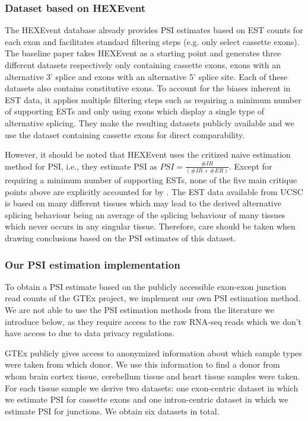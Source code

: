 \subsubsection{Dataset based on HEXEvent}
The HEXEvent database already provides PSI estimates based on EST counts for each exon and facilitates standard filtering steps (e.g. only select cassette exons). 
The baseline paper \cite{dsc} takes HEXEvent as a starting point and generates three different datasets respectively only containing cassette exons, exons with an alternative 3' splice and exons with an alternative 5' splice site. Each of these datasets also contains constitutive exons. To account for the biases inherent in EST data, it applies multiple filtering steps such as requiring a minimum number of supporting ESTs and only using exons which display a single type of alternative splicing. They make the resulting datasets publicly available and we use the dataset containing cassette exons for direct comparability. 

However, it should be noted that HEXEvent uses the critized naive estimation method for PSI, i.e., they estimate PSI as $PSI = \frac{\#IR}{(\#IR+\#ER)}$. Except for requiring a minimum number of supporting ESTs, none of the five main critique points above are explicitly accounted for by \cite{dsc}. The EST data available from UCSC is based on many different tissues which may lead to the derived alternative splicing behaviour being an average of the splicing behaviour of many tissues which never occurs in any singular tissue. %
Therefore, care should be taken when drawing conclusions based on the PSI estimates of this dataset. 

\subsubsection{Our PSI estimation implementation} \label{subsubsec:implementedpsiestimation}
To obtain a PSI estimate based on the publicly accessible exon-exon junction read counts of the GTEx project, we implement our own PSI estimation method. We are not able to use the PSI estimation methods from the literature we introduce below, as they require access to the raw RNA-seq reads which we don't have access to due to data privacy regulations.

GTEx publicly gives access to anonymized information about which sample types were taken from which donor. We use this information to find a donor from whom brain cortex tissue, cerebellum tissue and heart tissue samples were taken. For each tissue sample we derive two datasets: one exon-centric dataset in which we estimate PSI for cassette exons and one intron-centric dataset in which we estimate PSI for junctions. 
We obtain six datasets in total.

